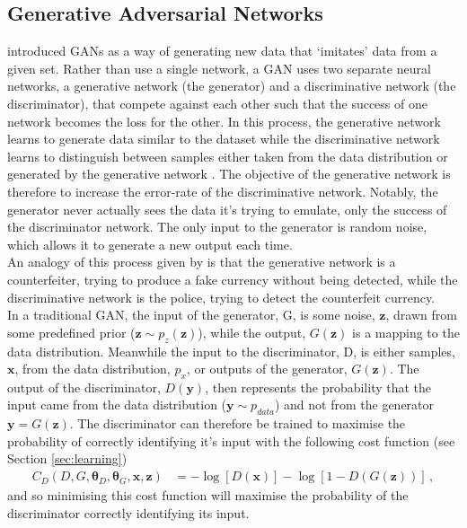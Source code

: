 \documentclass[11pt,a4paper,onecolumn]{report}
\begin{document}
\subsection{Generative Adversarial Networks}
\label{sec:gan}
\citet{Goodfellow2014} introduced GANs as a way of generating
new data that `imitates' data from a given set. Rather than use a single
network, a GAN uses two separate neural networks, a generative network (the
generator) and a discriminative network (the discriminator), that compete
against each other such that the success of one network becomes the loss for the
other. In this process, the generative network learns to generate data similar
to the dataset while the discriminative network learns to distinguish between
samples either taken from the data distribution or generated by the generative
network \citep{Goodfellow2014}. The objective of the generative network is
therefore to increase the error-rate of the discriminative network. Notably, the
generator never actually sees the data it's trying to emulate, only the success
of the discriminator network. The only input to the generator is random noise,
which allows it to generate a new output each time. \\

An analogy of this process given by \citet{Goodfellow2014} is that the generative
network is a counterfeiter, trying to produce a fake currency without being
detected, while the discriminative network is the police, trying to detect the
counterfeit currency.\\

In a traditional GAN, the input of the generator, G, is some noise, \(\bm{z}\),
drawn from some predefined prior (\(\bm{z} \sim  p_z(\bm{z})\)), while
the output, \(G(\bm{z})\) is a mapping to the data distribution. Meanwhile the
input to the discriminator, D, is either samples, \(\bm{x}\), from the data
distribution, \(p_x\), or outputs of the generator, \(G(\bm{z})\). The output of
the discriminator, \(D(\bm{y})\), then represents the probability that the input
came from the data distribution (\( \bm{y} \sim p_{data}\)) and not from the
generator \(\bm{y} = G(\bm{z})\). The discriminator can therefore be trained to
maximise the probability of correctly identifying it's input with the
following cost function (see Section \ref{sec:learning})
\begin{align}
  C_D(D, G, \bm{\theta}_D, \bm{\theta}_G, \bm{x}, \bm{z}) &=
  -\log[D(\bm{x})] - \log[1 - D(G(\bm{z}))]\,,
\end{align}
and so minimising this cost function will maximise the probability of the
discriminator correctly identifying its input.\\
\end{document}
